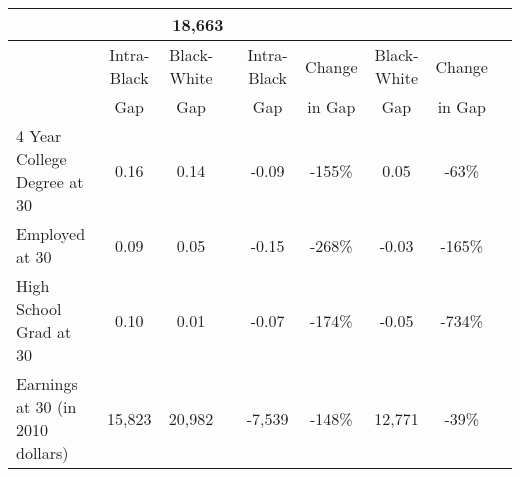 \begin{table}[htbp]
\begin{center}
\begin{tabular}{lcccccccc}
 &\multicolumn{4}{c}{      18,663} &
 \\[0.2cm]  
\hline
&Intra-Black &Black-White & &Intra-Black &Change &Black-White &Change  \\[0.02cm] 
&Gap &Gap & &Gap &in Gap &Gap &in Gap  \\[0.01cm] 
\hline
4 Year College Degree at 30 &        0.16&        0.14&&       -0.09&        -155\% &        0.05&         -63\% &
 \\[0.2cm]  
Employed at 30 &        0.09&        0.05&&       -0.15&        -268\% &       -0.03&        -165\% &
 \\[0.2cm]  
High School Grad at 30 &        0.10&        0.01&&       -0.07&        -174\% &       -0.05&        -734\% &
 \\[0.2cm]  
Earnings at 30 (in 2010 dollars) &      15,823&      20,982&&      -7,539&        -148\% &      12,771&         -39\% &
 \\[0.2cm]  
  \hline \hline    \end{tabular}
 \end{center} 
       {\scriptsize  
       {\raggedright 
}}
\end{table}
